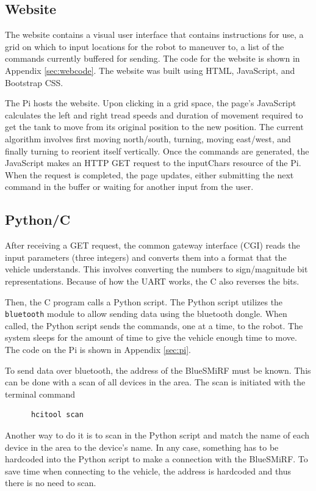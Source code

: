 \documentclass[12pt]{article}
\begin{document}
\subsection{Website}

The website contains a visual user interface that contains instructions for use, a grid on which to input locations for the robot to maneuver to, a list of the commands currently buffered for sending. The code for the website is shown in Appendix \ref{sec:webcode}. The website was built using HTML, JavaScript, and Bootstrap CSS. 

The Pi hosts the website. Upon clicking in a grid space, the page's JavaScript calculates the left and right tread speeds and duration of movement required to get the tank to move from its original position to the new position. The current algorithm involves first moving north/south, turning, moving east/west, and finally turning to reorient itself vertically. Once the commands are generated, the JavaScript makes an HTTP GET request to the inputChars resource of the Pi. When the request is completed, the page updates, either submitting the next command in the buffer or waiting for another input from the user.

\subsection{Python/C}
After receiving a GET request, the common gateway interface (CGI) reads the input parameters (three integers) and converts them into a format that the vehicle understands. This involves converting the numbers to sign/magnitude bit representations. Because of how the UART works, the C also reverses the bits.

Then, the C program calls a Python script. The Python script utilizes the \verb.bluetooth. module to allow sending data using the bluetooth dongle. When called, the Python script sends the commands, one at a time, to the robot. The system sleeps for the amount of time to give the vehicle enough time to move. The code on the Pi is shown in Appendix \ref{sec:pi}. 

To send data over bluetooth, the address of the BlueSMiRF must be known. This can be done with a scan of all devices in the area. The scan is initiated with the terminal command
\begin{verbatim}
      hcitool scan
\end{verbatim}
Another way to do it is to scan in the Python script and match the name of each device in the area to the device's name. In any case, something has to be hardcoded into the Python script to make a connection with the BlueSMiRF. To save time when connecting to the vehicle, the address is hardcoded and thus there is no need to scan.
\end{document}
